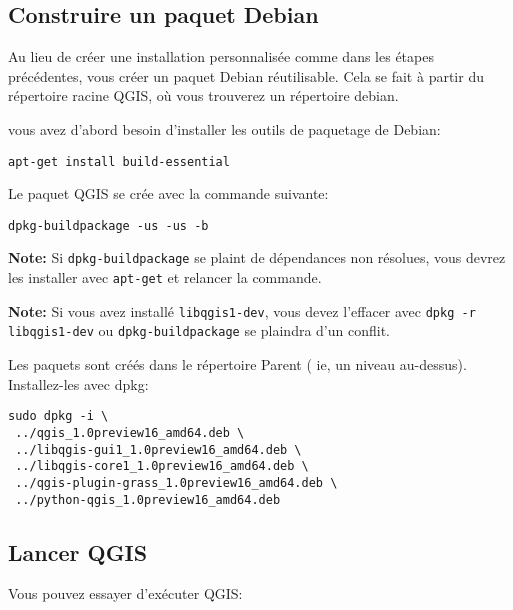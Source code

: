 \subsection{Construire un paquet Debian}
Au lieu de créer une installation personnalisée comme dans les étapes précédentes, vous créer un paquet Debian réutilisable. 	
Cela se fait à partir du répertoire racine QGIS, où vous trouverez un répertoire debian.

vous avez d'abord besoin d'installer les outils de paquetage de Debian:

\begin{verbatim}
apt-get install build-essential
\end{verbatim}

Le paquet QGIS se crée avec la commande suivante:

\begin{verbatim}
dpkg-buildpackage -us -us -b
\end{verbatim}

\textbf{Note:} Si \texttt{dpkg-buildpackage} se plaint de dépendances non résolues, vous devrez les installer avec \texttt{apt-get} et relancer la commande.

\textbf{Note:} Si vous avez installé \texttt{libqgis1-dev}, vous devez l'effacer avec \texttt{dpkg -r libqgis1-dev} ou \texttt{dpkg-buildpackage} se plaindra d'un conflit.

Les paquets sont créés dans le répertoire Parent ( ie, un niveau au-dessus).
Installez-les avec dpkg:

\begin{verbatim}
sudo dpkg -i \
 ../qgis_1.0preview16_amd64.deb \
 ../libqgis-gui1_1.0preview16_amd64.deb \
 ../libqgis-core1_1.0preview16_amd64.deb \
 ../qgis-plugin-grass_1.0preview16_amd64.deb \
 ../python-qgis_1.0preview16_amd64.deb
\end{verbatim}

% 
% 

\subsection{Lancer QGIS}
Vous pouvez essayer d'exécuter QGIS:

